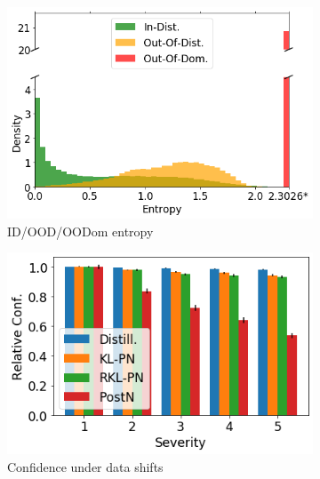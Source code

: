 \begin{figure}[H]
    \vspace{-.5cm}
    \centering
    \begin{subfigure}[t]{0.33 \textwidth}
        \centering
        \includegraphics[width=.98 \textwidth]{sections/006_neurips2020/figures/entropy_CIFAR10.png}
        \caption{ID/OOD/OODom entropy}
    \end{subfigure}%
    \begin{subfigure}[t]{0.33 \textwidth}
        \centering
        \includegraphics[width=.98 \textwidth]{sections/006_neurips2020/figures/shifts_CIFAR10_conf.png}
        \caption{Confidence under data shifts}
    \end{subfigure}%
    \begin{subfigure}[t]{0.33 \textwidth}
        \centering

\end{subfigure}
\end{figure}
